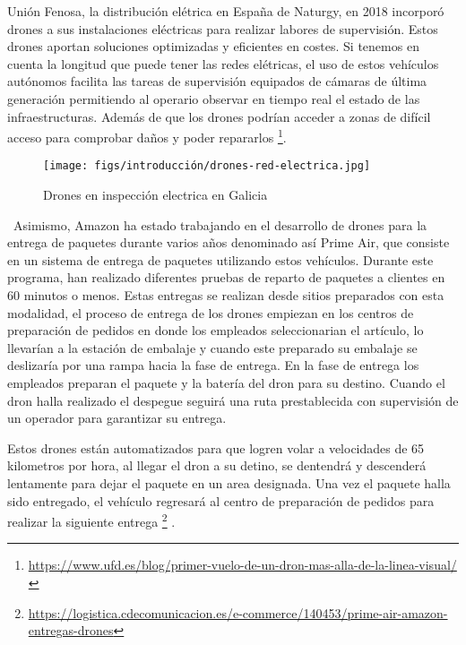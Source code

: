Unión Fenosa, la distribución elétrica en España de Naturgy, en 2018 incorporó drones a sus instalaciones eléctricas para realizar labores de supervisión. Estos drones aportan 
soluciones optimizadas y eficientes en costes. Si tenemos en cuenta la longitud que puede tener las redes elétricas, el uso de estos vehículos
autónomos facilita las tareas de supervisión equipados de cámaras de última generación permitiendo al operario observar en tiempo real el estado de las infraestructuras. Además de que los
drones podrían acceder a zonas de difícil acceso para comprobar daños y poder repararlos \footnote{\url{https://www.ufd.es/blog/primer-vuelo-de-un-dron-mas-alla-de-la-linea-visual/}}. \newline 


\begin{figure} [H]
  \begin{center}
    \texttt{[image: figs/introducción/drones-red-electrica.jpg]}
  \end{center}
  \caption{Drones en inspección electrica en Galicia}
  \label{fig:Fenosa}
\end{figure}\
Asimismo, Amazon ha estado trabajando en el desarrollo de drones para la entrega de paquetes durante varios años denominado así Prime Air\cite{AmazonPrimeAir}, 
que consiste en un sistema de entrega de paquetes utilizando estos vehículos. Durante este programa, han realizado diferentes pruebas de reparto de paquetes a clientes
en 60 minutos o menos. Estas entregas se realizan desde sitios preparados con esta modalidad, el proceso de entrega de los drones empiezan en los centros de preparación de pedidos en 
donde los empleados seleccionarian el artículo, lo llevarían a la estación de embalaje y cuando este preparado su embalaje se deslizaría por una rampa hacia la fase de
entrega. 
En la fase de entrega los empleados preparan el paquete y la batería del dron para su destino. Cuando el dron halla realizado el despegue seguirá una ruta prestablecida con supervisión
de un operador para garantizar su entrega. \newline

Estos drones están automatizados para que logren volar a velocidades de 65 kilometros por hora, al llegar el dron a su detino, se dentendrá y descenderá lentamente para dejar el 
paquete en un area designada. Una vez el paquete halla sido entregado, el vehículo regresará al centro de preparación de pedidos para realizar la siguiente entrega 
\footnote{\url{https://logistica.cdecomunicacion.es/e-commerce/140453/prime-air-amazon-entregas-drones}} . 

